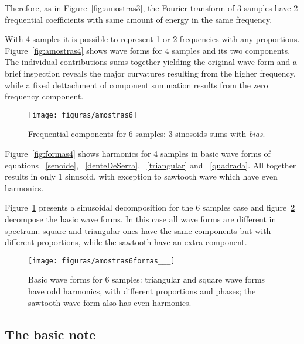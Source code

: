 \documentclass[
 aip,
 jmp,
 amsmath,amssymb,
 reprint,
]{revtex4-1}
\begin{document}
Therefore, as in Figure~\ref{fig:amostras3}, the Fourier transform of 3 samples have 2 frequential coefficients with same amount of energy in the same frequency.

With 4 samples it is possible to represent 1 or 2 frequencies with any proportions. Figure~\ref{fig:amostras4} shows wave forms for 4 samples and its two components. The individual contributions sums together yielding the original wave form and a brief inspection reveals the major curvatures resulting from the higher frequency, while a fixed dettachment of component summation results from the zero frequency component.

\begin{figure}[h!]
    \centering
        \texttt{[image: figuras/amostras6]}
    \caption{Frequential components for 6 samples: 3 sinosoids sums with \emph{bias}.}
        \label{fig:amostras6}
\end{figure}

Figure~\ref{fig:formas4} shows harmonics for 4 samples in basic wave forms of equations ~\ref{senoide}, ~\ref{denteDeSerra}, ~\ref{triangular} and ~\ref{quadrada}. All together results in only 1 sinusoid, with exception to sawtooth wave which have even harmonics.

Figure~\ref{fig:amostras6} presents a sinusoidal decomposition for the 6 samples case and figure~\ref{fig:formas6} decompose the basic wave forms.
In this case all wave forms are different in spectrum: square and triangular ones have the same components but with different proportions, while the sawtooth have an extra component.

\begin{figure}[h!]
    \centering
        \texttt{[image: figuras/amostras6formas\_\_\_]}
    \caption{Basic wave forms for 6 samples: triangular and square wave forms have odd harmonics, with different proportions and phases; the sawtooth wave form also has even harmonics.}
        \label{fig:formas6}
\end{figure}

\subsection{The basic note}\label{notaBasica}

\end{document}
